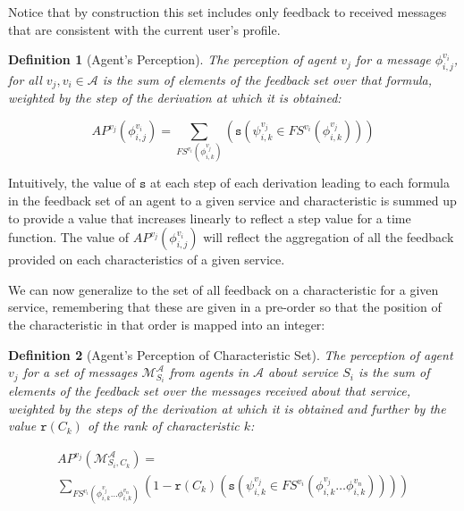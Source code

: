 \documentclass[compsoc, conference, letterpaper, 10pt, times]{IEEEtran}
\newtheorem{definition}{Definition}
\begin{document}
Notice that by construction this set includes only feedback to received messages that are consistent with the current user's profile. 

\begin{definition}[Agent's Perception]
The perception of agent $v_{j}$ for a message $\phi^{v_{i}}_{i,j}$, for all $v_{j}, v_{i} \in \mathcal{A}$ is the sum of elements of the feedback set over that formula, weighted by the step of the derivation at which it is obtained: 

\[
AP^{v_{j}}(\phi^{v_{i}}_{i,j})=\sum_{FS^{v_{i}}(\phi^{v_{j}}_{i,k})}(\mathtt{s}(\psi^{v_{j}}_{i,k} \in FS^{v_{i}}(\phi^{v_{j}}_{i,k})))
\]

\end{definition}

Intuitively, the value of $\mathtt{s}$ at each step of each derivation leading to each formula in the feedback set of an agent to a given service and characteristic is summed up to provide a value that increases linearly to reflect a step value for a time function. The value of $AP^{v_{j}}(\phi^{v_{i}}_{i,j})$ will reflect the aggregation of all the feedback provided on each characteristics of a given service.  


We can now generalize to the set of all feedback on a characteristic for a given service, remembering that these are given in a pre-order so that the position of the characteristic in that order is mapped into an integer:


\begin{definition}[Agent's Perception of Characteristic Set]
The perception of agent $v_{j}$ for a set of messages $\mathcal{M}^{\mathcal{A}}_{S_{i}}$ from agents in $\mathcal{A}$ about service $S_{i}$ 
is the sum of elements of the feedback set over the messages received about that service, weighted by the steps of the derivation at which it is obtained and further by the value $\mathtt{r}(C_{k})$ of the rank of characteristic $k$: 


\begin{displaymath}
\begin{array}{l}

AP^{v_{j}}(\mathcal{M}^{\mathcal{A}}_{S_{i}, C_{k}})=\\
\sum_{FS^{v_{i}}(\phi^{v_{j}}_{i,k}\dots \phi^{v_{n}}_{i,k})}
(1-\mathtt{r}(C_{k})(\mathtt{s}(\psi^{v_{j}}_{i,k} \in FS^{v_{i}}(\phi^{v_{j}}_{i,k}\dots \phi^{v_{n}}_{i,k}))))
\end{array}
\end{displaymath}

\end{definition}
\end{document}
